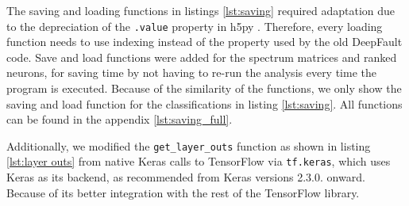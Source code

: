 


The saving and loading functions in listings \ref{lst:saving} required adaptation due to the depreciation of the \texttt{.value} property in h5py \cite{collette_h5pyh5py_2022}.
Therefore, every loading function needs to use indexing instead of the property used by the old DeepFault code.
Save and load functions were added for the spectrum matrices and ranked neurons, for saving time by not having to re-run the analysis every time the program is executed.
Because of the similarity of the functions, we only show the saving and load function for the classifications in listing \ref{lst:saving}.
All functions can be found in the appendix \ref{lst:saving_full}.


Additionally, we modified the \texttt{get\_layer\_outs} function as shown in listing \ref{lst:layer outs} from native Keras \cite{chollet_keras_2015} calls to TensorFlow \cite{martin_abadi_tensorflow_2015} via \texttt{tf.keras}, which uses Keras as its backend, as recommended from Keras versions 2.3.0. \cite{keras_release_nodate} onward.
Because of its better integration with the rest of the TensorFlow library.

